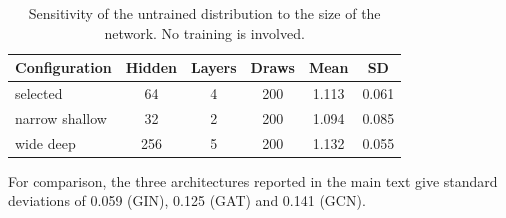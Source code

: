 \begin{table}[htbp]
\centering
\caption{Sensitivity of the untrained distribution to the size of the network. No training is involved.}
\label{tab:si_nullhp}
\footnotesize
\setlength{\tabcolsep}{4pt}
\begin{tabular}{lccccc}
\toprule
Configuration & Hidden & Layers & Draws & Mean & SD \\
\midrule
selected & 64 & 4 & 200 & 1.113 & 0.061 \\
narrow shallow & 32 & 2 & 200 & 1.094 & 0.085 \\
wide deep & 256 & 5 & 200 & 1.132 & 0.055 \\
\bottomrule
\end{tabular}
\begin{flushleft}\footnotesize For comparison, the three architectures reported in the main text give standard deviations of 0.059 (GIN), 0.125 (GAT) and 0.141 (GCN).\end{flushleft}
\end{table}
